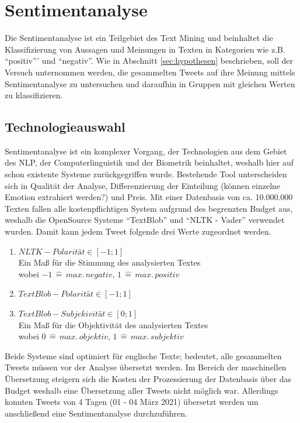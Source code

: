 \chapter{Sentimentanalyse}
\label{chap:sentiment}
Die Sentimentanalyse ist ein Teilgebiet des \gls{Text Mining} und beinhaltet die Klassifizierung von Aussagen und Meinungen in Texten in Kategorien wie z.B. "`positiv"'' und "`negativ"'. Wie in Abschnitt \ref{sec:hypothesen} beschrieben, soll der Versuch unternommen werden, die gesammelten Tweets auf ihre Meinung mittels Sentimentanalyse zu untersuchen und daraufhin in Gruppen mit gleichen Werten zu klassifizieren. 
\section{Technologieauswahl}
\label{sec:Technologieauswahl}
Sentimentanalyse ist ein komplexer Vorgang, der Technologien aus dem Gebiet des \ac{NLP}, der Computerlinguistik und der Biometrik beinhaltet, weshalb hier auf schon existente Systeme zurückgegriffen wurde.
Bestehende Tool unterscheiden sich in Qualität der Analyse, Differenzierung der Einteilung (können einzelne Emotion extrahiert werden?) und Preis. 
Mit einer Datenbasis von ca. 10.000.000 Texten fallen alle kostenpflichtigen System aufgrund des begrenzten Budget aus, weshalb  die \gls{OpenSource} Systeme "`TextBlob"' und "`NLTK - Vader"' verwendet wurden. Damit kann jedem Tweet folgende drei Werte zugeordnet werden.
\begin{enumerate}
	\item $NLTK - Polarität \in [-1;1]$\\ Ein Maß für die Stimmung des analysierten Textes\\ wobei $-1\,\hat{=}\,max.\,negativ,\,1\,\hat{=} \,max.\,positiv$ 
	\item $TextBlob - Polarität \in [-1;1]$
	\item $TextBlob - Subjekivität \in [0;1]$\\ Ein Maß für die Objektivität des analysierten Textes\\ wobei $0\,\hat{=}\,max.\,objektiv,\,1\,\hat{=} \,max.\,subjektiv$ 
\end{enumerate}

Beide Systeme sind optimiert für englische Texte; bedeutet, alle gesammelten Tweets müssen vor der Analyse übersetzt werden. Im Bereich der maschinellen Übersetzung steigern sich die Kosten der Prozessierung der Datenbasis über das Budget weshalb eine Übersetzung aller Tweets nicht möglich war.
Allerdings konnten Tweets von 4 Tagen (01 - 04 März 2021)  übersetzt werden um anschließend eine Sentimentanalyse durchzuführen.

